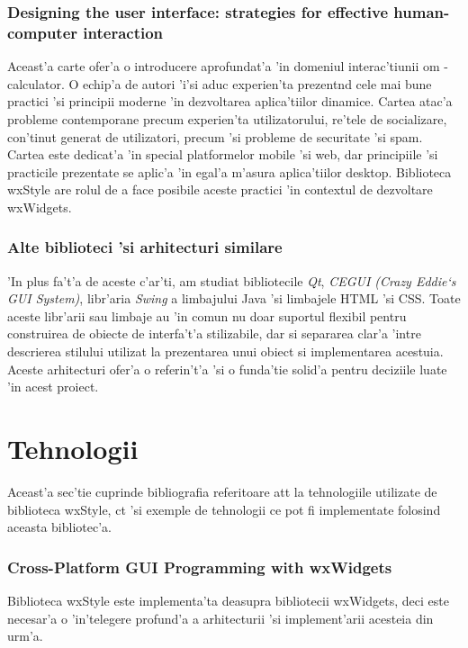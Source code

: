 \subsubsection{Designing the user interface: strategies for effective human-computer interaction}

Aceast'a carte ofer'a o introducere aprofundat'a 'in domeniul interac'tiunii om - calculator. O echip'a de autori 'i'si aduc experien'ta prezent{\ia}nd cele mai bune practici 'si principii moderne 'in dezvoltarea aplica'tiilor dinamice. Cartea atac'a probleme contemporane precum experien'ta utilizatorului, re'tele de socializare, con'tinut generat de utilizatori, precum 'si probleme de securitate 'si spam. Cartea este dedicat'a 'in special platformelor mobile 'si web, dar principiile 'si practicile prezentate se aplic'a 'in egal'a m'asura aplica'tiilor desktop. Biblioteca wxStyle are rolul de a face posibile aceste practici 'in contextul de dezvoltare wxWidgets.

\subsubsection{Alte biblioteci 'si arhitecturi similare}

'In plus fa't'a de aceste c'ar'ti, am studiat bibliotecile \emph{Qt}, \emph{CEGUI (Crazy Eddie`s GUI System)}, libr'aria \emph{Swing} a limbajului Java 'si limbajele HTML 'si CSS. Toate aceste libr'arii sau limbaje au 'in comun nu doar suportul flexibil pentru construirea de obiecte de interfa't'a stilizabile, dar si separarea clar'a 'intre descrierea stilului utilizat la prezentarea unui obiect si implementarea acestuia. Aceste arhitecturi ofer'a o referin't'a 'si o funda'tie solid'a pentru deciziile luate 'in acest proiect.

\section{Tehnologii}

Aceast'a sec'tie cuprinde bibliografia referitoare at{\ia}t la tehnologiile utilizate de biblioteca wxStyle, c{\ia}t 'si exemple de tehnologii ce pot fi implementate folosind aceasta bibliotec'a.

\subsubsection{Cross-Platform GUI Programming with wxWidgets}

Biblioteca wxStyle este implementa'ta deasupra bibliotecii wxWidgets, deci este necesar'a o 'in'telegere profund'a a arhitecturii 'si implement'arii acesteia din urm'a.

